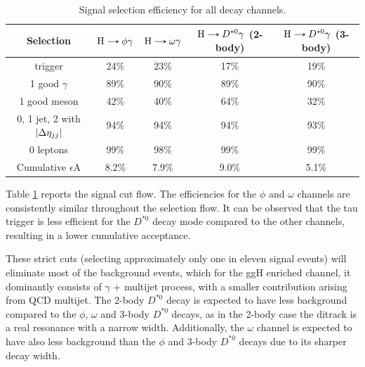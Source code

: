 \begin{table}[!ht]
    \centering
    \begin{tabular}{|c|c|c|c|c|}
        \hline
        \cellcolor{lightgray}Selection &\cellcolor{lightgray}$\text{H}\decaysto \phi\gamma$ &\cellcolor{lightgray}$\text{H}\decaysto \omega\gamma$ &\cellcolor{lightgray}$\text{H}\decaysto D^{*0}\gamma$ {\scriptsize(2-body)}&\cellcolor{lightgray}$\text{H}\decaysto D^{*0}\gamma$ {\scriptsize(3-body)}\\ \hline
        trigger                                     & 24\%  & 23\%  & 17\%  & 19\% \\
        1 good $\gamma$                             & 89\%  & 90\%  & 89\%  & 90\% \\
        1 good meson                                & 42\%  & 40\%  & 64\%  & 32\% \\
        0, 1 jet, 2 with $\left\lvert\Delta\eta_{jj}\right\rvert$    & 94\%  & 94\%  & 94\%  & 93\% \\
        0 leptons                                   & 99\%  & 98\%  & 99\%  & 99\% \\ \hline
        Cumulative $\epsilon$A                      & 8.2\%  & 7.9\%  & 9.0\%  & 5.1\% \\
        \hline
        \end{tabular}
    \caption{Signal selection efficiency for all decay channels.}
    \label{tab:selection_efficiency}
\end{table}
Table \ref{tab:selection_efficiency} reports the signal cut flow. The efficiencies for the $\phi$ and $\omega$ channels are consistently similar throughout the selection flow. It can be observed that the tau trigger is less efficient for the $D^{*0}$ decay mode compared to the other channels, resulting in a lower cumulative acceptance.

These strict cuts (selecting approximately only one in eleven signal events) will eliminate most of the background events, which for the ggH enriched channel, it dominantly consists of $\gamma$ + multijet process, with a smaller contribution arising from QCD multijet. The 2-body $D^{*0}$ decay is expected to have less background compared to the $\phi$, $\omega$ and 3-body $D^{*0}$ decays, as in the 2-body case the ditrack is a real resonance with a narrow width. Additionally, the $\omega$ channel is expected to have also less background than the $\phi$ and 3-body $D^{*0}$ decays due to its sharper decay width.

